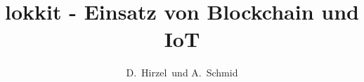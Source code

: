 \documentclass[bachelor,german]{hgbthesis}
\begin{document}

\title{lokkit - Einsatz von Blockchain und IoT}
\author{D.\ Hirzel\ und A.\ Schmid}

\frontmatter
\maketitle
\tableofcontents




\mainmatter         %





\appendix

\MakeBibliography


\end{document}
